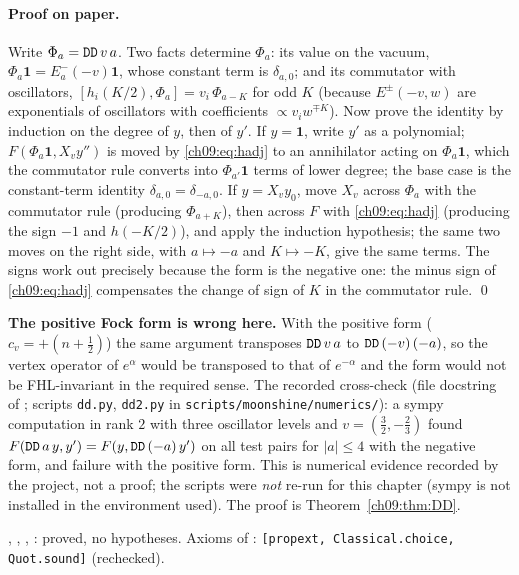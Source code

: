 \paragraph{Proof on paper.} Write $\Phi_a=\lean{DD}\,v\,a$. Two facts determine $\Phi_a$: its
value on the vacuum, $\Phi_a\mathbf1=E^-_a(-v)\mathbf1$, whose constant term is $\delta_{a,0}$;
and its commutator with oscillators, $[h_i(K/2),\Phi_a]=v_i\,\Phi_{a-K}$ for odd $K$ (because
$E^\pm(-v,w)$ are exponentials of oscillators with coefficients $\propto v_iw^{\mp K}$). Now prove
the identity by induction on the degree of $y$, then of $y'$. If $y=\mathbf1$, write $y'$ as a
polynomial; $F(\Phi_a\mathbf1,X_vy'')$ is moved by \eqref{ch09:eq:hadj} to an annihilator acting on
$\Phi_a\mathbf 1$, which the commutator rule converts into $\Phi_{a'}\mathbf1$ terms of lower degree;
the base case is the constant-term identity $\delta_{a,0}=\delta_{-a,0}$. If $y=X_vy_0$, move $X_v$
across $\Phi_a$ with the commutator rule (producing $\Phi_{a+K}$), then across $F$ with
\eqref{ch09:eq:hadj} (producing the sign $-1$ and $h(-K/2)$), and apply the induction hypothesis;
the same two moves on the right side, with $a\mapsto-a$ and $K\mapsto-K$, give the same terms. The
signs work out precisely because the form is the negative one: the minus sign of
\eqref{ch09:eq:hadj} compensates the change of sign of $K$ in the commutator rule. \qed

\begin{warning}
\textbf{The positive Fock form is wrong here.} With the positive form ($c_v=+(n+\frac12)$) the same
argument transposes $\lean{DD}\,v\,a$ to $\lean{DD}\,(-v)\,(-a)$, so the vertex operator of
$e^\alpha$ would be transposed to that of $e^{-\alpha}$ and the form would not be FHL-invariant
in the required sense. The recorded cross-check (file docstring of
; scripts \texttt{dd.py}, \texttt{dd2.py} in
\texttt{scripts/moonshine/numerics/}): a sympy computation in rank $2$ with three oscillator levels
and $v=(\frac32,-\frac23)$ found $F(\lean{DD}\,a\,y,y')=F(y,\lean{DD}\,(-a)\,y')$ on all test pairs
for $|a|\le4$ with the negative form, and failure with the positive form. This is numerical
evidence recorded by the project, not a proof; the scripts were \emph{not} re-run for this chapter
(sympy is not installed in the environment used). The proof is Theorem~\ref{ch09:thm:DD}.
\end{warning}

\begin{status}
, , , : proved,
no hypotheses. Axioms of : \texttt{[propext, Classical.choice, Quot.sound]}
(rechecked).
\end{status}

